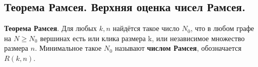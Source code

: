 \subsection{Теорема Рамсея. Верхняя оценка чисел Рамсея.}



\textbf{Теорема Рамсея}. Для любых $k, n$ найдётся такое число $N_0$, что в любом графе на $N \geq N_0$ вершинах есть или клика размера k, или независимое множество размера $n$. Минимальное такое $N_0$ называют \textbf{числом Рамсея}, обозначается $R(k, n)$.